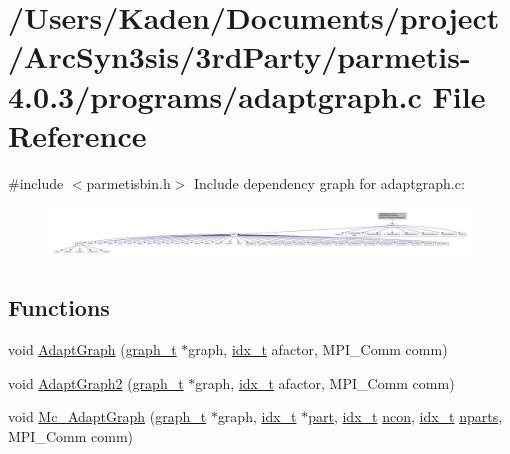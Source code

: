 \hypertarget{a00422}{}\section{/\+Users/\+Kaden/\+Documents/project/\+Arc\+Syn3sis/3rd\+Party/parmetis-\/4.0.3/programs/adaptgraph.c File Reference}
\label{a00422}
{\ttfamily \#include $<$parmetisbin.\+h$>$}\newline
Include dependency graph for adaptgraph.\+c\+:\nopagebreak
\begin{figure}[H]
\begin{center}
\leavevmode
\includegraphics[width=350pt]{a00423}
\end{center}
\end{figure}
\subsection*{Functions}
\begin{DoxyCompactItemize}
\item 
void \hyperlink{a00422_abe7cfd52605c309687e45b1d1e0d936c}{Adapt\+Graph} (\hyperlink{a00734}{graph\+\_\+t} $\ast$graph, \hyperlink{a00876_aaa5262be3e700770163401acb0150f52}{idx\+\_\+t} afactor, M\+P\+I\+\_\+\+Comm comm)
\item 
void \hyperlink{a00422_afc0964cfd8b3e05ef87d2f8cca22818f}{Adapt\+Graph2} (\hyperlink{a00734}{graph\+\_\+t} $\ast$graph, \hyperlink{a00876_aaa5262be3e700770163401acb0150f52}{idx\+\_\+t} afactor, M\+P\+I\+\_\+\+Comm comm)
\item 
void \hyperlink{a00422_a82918f9e496dea47e55d3f6b23db0449}{Mc\+\_\+\+Adapt\+Graph} (\hyperlink{a00734}{graph\+\_\+t} $\ast$graph, \hyperlink{a00876_aaa5262be3e700770163401acb0150f52}{idx\+\_\+t} $\ast$\hyperlink{a00879_a0a9ea8670f88d6db1e021fee2dcd94be}{part}, \hyperlink{a00876_aaa5262be3e700770163401acb0150f52}{idx\+\_\+t} \hyperlink{a00879_ac1dd31740e8f97fb57dc917ded30253f}{ncon}, \hyperlink{a00876_aaa5262be3e700770163401acb0150f52}{idx\+\_\+t} \hyperlink{a00879_aad88065af88fd6759101788a8e15ce9e}{nparts}, M\+P\+I\+\_\+\+Comm comm)
\end{DoxyCompactItemize}


